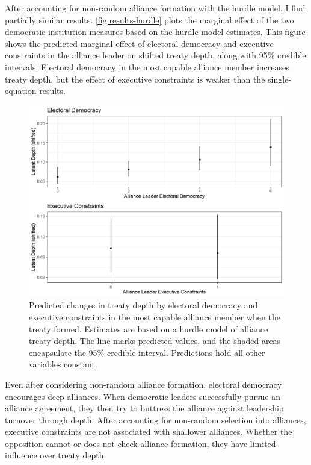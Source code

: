 \documentclass[12pt]{article}
\begin{document}
After accounting for non-random alliance formation with the hurdle model, I find partially similar results. 
\autoref{fig:results-hurdle} plots the marginal effect of the two democratic institution measures based on the hurdle model estimates. 
This figure shows the predicted marginal effect of electoral democracy and executive constraints in the alliance leader on shifted treaty depth, along with 95\% credible intervals.
Electoral democracy in the most capable alliance member increases treaty depth, but the effect of executive constraints is weaker than the single-equation results.  


\begin{figure}
\includegraphics[width=.95\textwidth]{../figures/results-hurdle.png}  
\caption{Predicted changes in treaty depth by electoral democracy and executive constraints in the most capable alliance member when the treaty formed. Estimates are based on a hurdle model of alliance treaty depth. The line marks predicted values, and the shaded areas encapsulate the 95\% credible interval. Predictions hold all other variables constant.}
\label{fig:results-hurdle}
\end{figure}


Even after considering non-random alliance formation, electoral democracy encourages deep alliances. 
When democratic leaders successfully pursue an alliance agreement, they then try to buttress the alliance against leadership turnover through depth. 
After accounting for non-random selection into alliances, executive constraints are not associated with shallower alliances.
Whether the opposition cannot or does not check alliance formation, they have limited influence over treaty depth. 
\end{document}
